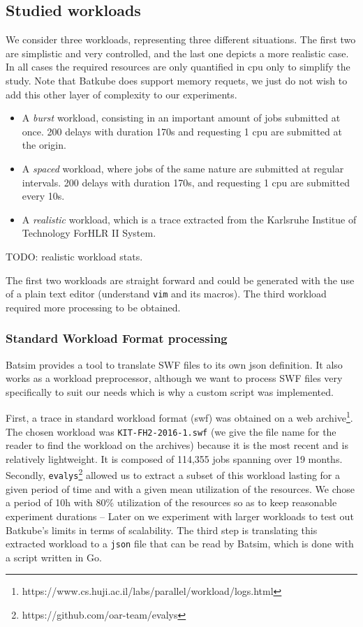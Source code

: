\subsection{Studied workloads} \label{sec:studied-workloads}

We consider three workloads, representing three different situations. The first
two are simplistic and very controlled, and the last one depicts a more
realistic case. In all cases the required resources are only quantified in cpu
only to simplify the study. Note that Batkube does support memory requets, we
just do not wish to add this other layer of complexity to our experiments.

\begin{itemize}
	\item A \textit{burst} workload, consisting in an important amount of
		jobs submitted at once.  200 delays with duration 170s and
		requesting 1 cpu are submitted at the origin.
	\item A \textit{spaced} workload, where jobs of the same nature are
		submitted at regular intervals.  200 delays with duration 170s,
		and requesting 1 cpu are submitted every 10s.
	\item A \textit{realistic} workload, which is a trace extracted from the  Karlsruhe Institue of Technology ForHLR II System.
\end{itemize}

TODO: realistic workload stats.

The first two workloads are straight forward and could be generated with the
use of a plain text editor (understand \texttt{vim} and its macros). The third
workload required more processing to be obtained.  

\subsubsection{Standard Workload Format processing}

Batsim provides a tool to translate SWF files to its own json definition. It
also works as a workload preprocessor, although we want to process SWF files
very specifically to suit our needs which is why a custom script was
implemented.

First, a trace in standard workload format (swf) was obtained on a web
archive\footnote{https://www.cs.huji.ac.il/labs/parallel/workload/logs.html}.
The chosen workload was \texttt{KIT-FH2-2016-1.swf} (we give the file name for
the reader to find the workload on the archives) because it is the most recent
and is relatively lightweight. It is composed of 114,355 jobs spanning over 19
months. Secondly, \texttt{evalys}\footnote{https://github.com/oar-team/evalys}
allowed us to extract a subset of this workload lasting for a given period of
time and with a given mean utilization of the resources. We chose a period of
10h with 80\% utilization of the resources so as to keep reasonable experiment
durations -- Later on we experiment with larger workloads to test out Batkube's
limits in terms of scalability.  The third step is translating this extracted
workload to a \texttt{json} file that can be read by Batsim, which is done with
a script written in Go.

